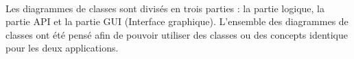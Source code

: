 \paragraph{}Les diagrammes de classes sont divisés en trois parties : la partie logique, la partie API et la partie GUI (Interface graphique). L'ensemble des diagrammes de classes ont été pensé afin de pouvoir utiliser des classes ou des concepts identique pour les deux applications.